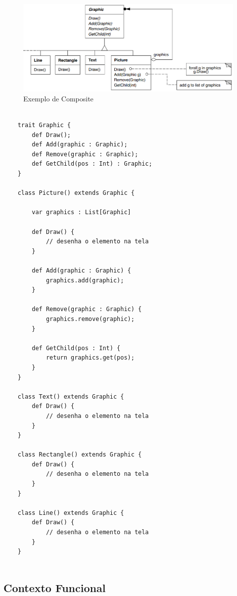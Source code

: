 \begin{figure}[htb]
	\caption{\label{composite_exemplo}Exemplo de Composite}
	\begin{center}
	    \includegraphics[scale=0.45]{5_padroes-contexto-funcional/5.2_estruturais/5.2.3_composite/exemplo_composite.png}
	\end{center}
\end{figure}

\begin{lstlisting}[caption={Composite Orientado a Objetos},label=oocomposite]

	trait Graphic {
		def Draw();
		def Add(graphic : Graphic);
		def Remove(graphic : Graphic);
		def GetChild(pos : Int) : Graphic;
	}

	class Picture() extends Graphic {
		
		var graphics : List[Graphic]
	
		def Draw() {
			// desenha o elemento na tela
		}

		def Add(graphic : Graphic) {
			graphics.add(graphic);
		}

		def Remove(graphic : Graphic) {
			graphics.remove(graphic);
		}

		def GetChild(pos : Int) {
			return graphics.get(pos);
		}
	}

	class Text() extends Graphic {
		def Draw() {
			// desenha o elemento na tela
		}
	}

	class Rectangle() extends Graphic {
		def Draw() {
			// desenha o elemento na tela
		}
	}

	class Line() extends Graphic {
		def Draw() {
			// desenha o elemento na tela
		}
	}


\end{lstlisting}

\subsection*{Contexto Funcional}



\begin{lstlisting}[caption={Composite Funcional},label=fpcomposite]
    

    
\end{lstlisting}